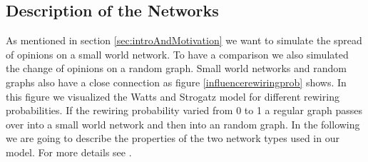 \subsection{Description of the Networks}
\label{sec:descriptionofnetwork}
As mentioned in section \ref{sec:introAndMotivation} we want to simulate the spread of opinions on a small world network. To have a comparison we also simulated the change of opinions on a random graph. Small world networks and random graphs also have a close connection as figure \ref{influencerewiringprob} shows. In this figure we visualized the Watts and Strogatz model for different rewiring probabilities. If the rewiring probability varied from 0 to 1 a regular graph passes over into a small world network and then into an random graph. In the following we are going to describe the properties of the two network types used in our model. For more details see \cite{Newman2010}.

